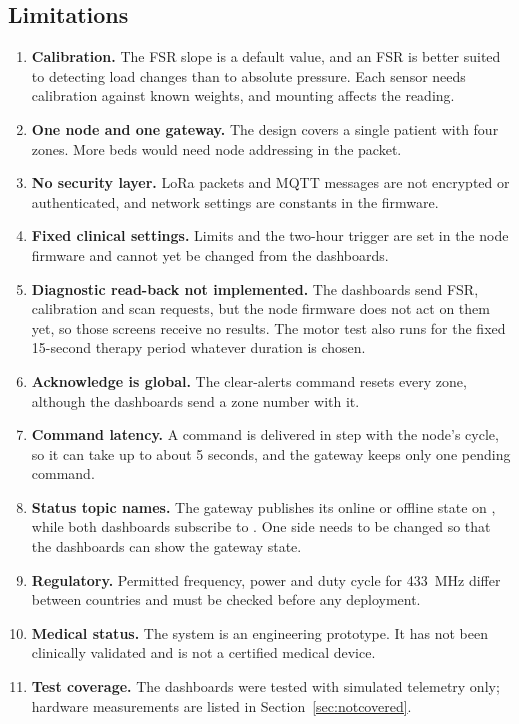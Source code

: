 \subsection{Limitations}
\label{sec:limits}
\begin{enumerate}
\item \textbf{Calibration.} The FSR slope is a default value, and an FSR is better suited to detecting load changes than to absolute pressure. Each sensor needs calibration against known weights, and mounting affects the reading.
\item \textbf{One node and one gateway.} The design covers a single patient with four zones. More beds would need node addressing in the packet.
\item \textbf{No security layer.} LoRa packets and MQTT messages are not encrypted or authenticated, and network settings are constants in the firmware.
\item \textbf{Fixed clinical settings.} Limits and the two-hour trigger are set in the node firmware and cannot yet be changed from the dashboards.
\item \textbf{Diagnostic read-back not implemented.} The dashboards send FSR, calibration and \itwoc{} scan requests, but the node firmware does not act on them yet, so those screens receive no results. The motor test also runs for the fixed 15-second therapy period whatever duration is chosen.
\item \textbf{Acknowledge is global.} The clear-alerts command resets every zone, although the dashboards send a zone number with it.
\item \textbf{Command latency.} A command is delivered in step with the node's cycle, so it can take up to about 5 seconds, and the gateway keeps only one pending command.
\item \textbf{Status topic names.} The gateway publishes its online or offline state on , while both dashboards subscribe to . One side needs to be changed so that the dashboards can show the gateway state.
\item \textbf{Regulatory.} Permitted frequency, power and duty cycle for 433~MHz differ between countries and must be checked before any deployment.
\item \textbf{Medical status.} The system is an engineering prototype. It has not been clinically validated and is not a certified medical device.
\item \textbf{Test coverage.} The dashboards were tested with simulated telemetry only; hardware measurements are listed in Section~\ref{sec:notcovered}.
\end{enumerate}

